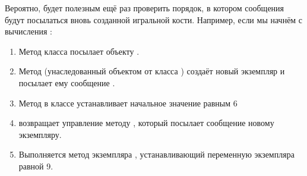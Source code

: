 \documentclass[a4paper,10pt,twoside]{book}
\begin{document}
Вероятно, будет полезным ещё раз проверить порядок, в котором сообщения будут посылаться вновь созданной игральной кости. Например, если мы начнём с 
вычисления :
\begin{enumerate}
	\item Метод класса  посылает  объекту .
	\item Метод  (унаследованный объектом  от класса ) создаёт новый экземпляр и посылает ему сообщение .
	\item Метод  в классе  устанавливает начальное значение  равным 6
	\item {} возвращает управление методу , который посылает сообщение  новому экземпляру.
	\item Выполняется метод экземпляра , устанавливающий переменную экземпляра  равной 9.
\end{enumerate}
\end{document}
